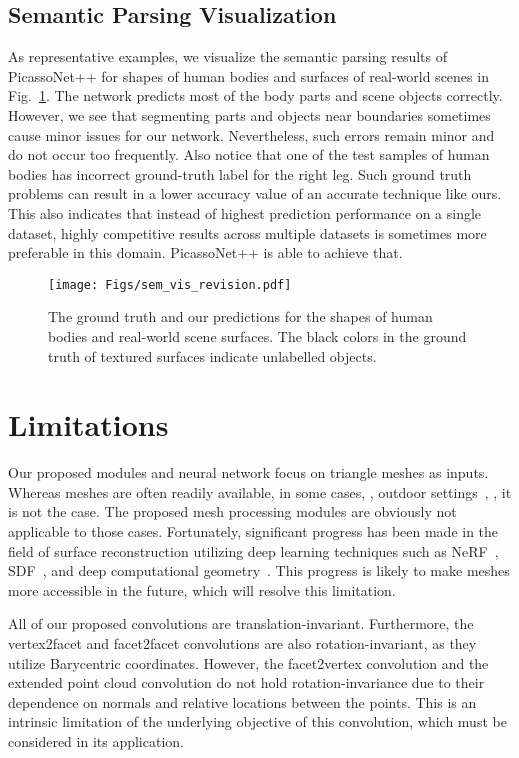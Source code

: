 \subsection{Semantic Parsing Visualization}
As representative examples, we visualize the semantic parsing results of PicassoNet++ for shapes of human bodies \cite{maron2017convolutional} and surfaces of real-world scenes \cite{dai2017scannet} in Fig.~\ref{fig:sem_vis}.
The network predicts most of the body parts and scene objects correctly. 
However, we see that segmenting parts and objects near boundaries sometimes  cause minor issues for our network. Nevertheless, such errors remain minor and do not occur too frequently. 
Also notice that one of the test samples of human bodies has incorrect ground-truth label for the right leg. Such ground truth problems can result in a lower accuracy value of an accurate technique like ours. This also indicates that instead of highest prediction performance on a single dataset, highly competitive results across multiple datasets is sometimes more preferable in this domain. PicassoNet++ is able to achieve that.  
\begin{figure}
    \centering
    \texttt{[image: Figs/sem\_vis\_revision.pdf]}
    \vspace{-2mm}
    \caption{\color{black}The ground truth and our predictions for the shapes of human bodies and real-world scene surfaces. The black colors in the ground truth of textured surfaces indicate unlabelled objects.}
    \label{fig:sem_vis}
     \vspace{-2mm}
\end{figure}

{\color{black}
\section{Limitations}
Our proposed modules and neural network focus on triangle meshes as inputs. Whereas meshes are often readily available, in some cases, \eg, outdoor settings~\cite{hackel2017semantic3d}, \cite{behley2019semantickitti}, it is not the case. 
The proposed mesh processing modules are obviously not applicable to those cases.  
Fortunately, significant progress has been made in the field of surface reconstruction utilizing deep learning techniques such as NeRF~\cite{mildenhall2020nerf,tancik2022block}, SDF~\cite{park2019deepsdf}, and deep computational geometry~\cite{chen2022neural,lei2023circnet}. This progress is likely to make meshes more accessible in the future, which will resolve this limitation. 

All of our proposed convolutions are translation-invariant. Furthermore, the vertex2facet and facet2facet convolutions are also rotation-invariant, as they utilize Barycentric coordinates. However, the facet2vertex convolution and the extended point cloud convolution do not hold rotation-invariance due to their dependence on normals and relative locations between the points. This is an intrinsic limitation of the underlying objective of this convolution, which must be considered in its application.  
} 

